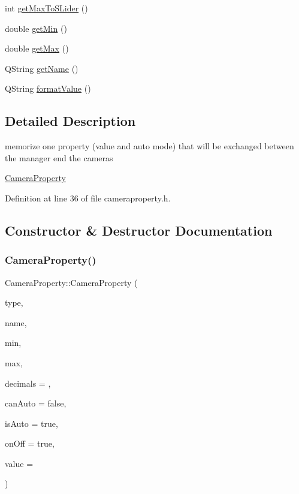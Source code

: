 \begin{DoxyCompactItemize}
int \mbox{\hyperlink{class_camera_manager_1_1_camera_property_a756d1e67c3e8f994e836c6b2b3334f13}{get\+Max\+To\+S\+Lider}} ()
\item 
double \mbox{\hyperlink{class_camera_manager_1_1_camera_property_a41de5747a0e0fa788b2e3260dc44d286}{get\+Min}} ()
\item 
double \mbox{\hyperlink{class_camera_manager_1_1_camera_property_ac4fc8a13780145042b4a8a825490aca4}{get\+Max}} ()
\item 
Q\+String \mbox{\hyperlink{class_camera_manager_1_1_camera_property_a789075edb5350c79f7fd807f3360d7e4}{get\+Name}} ()
\item 
Q\+String \mbox{\hyperlink{class_camera_manager_1_1_camera_property_ab3f85bdadf9078d3af6c1cf42f8fb1f1}{format\+Value}} ()
\end{DoxyCompactItemize}


\subsection{Detailed Description}
memorize one property (value and auto mode) that will be exchanged between the manager end the cameras 

\mbox{\hyperlink{class_camera_manager_1_1_camera_property}{Camera\+Property}} 

Definition at line 36 of file cameraproperty.\+h.



\subsection{Constructor \& Destructor Documentation}
\mbox{\label{class_camera_manager_1_1_camera_property_a7f096010f1d8c0cb5a0b7e3c592196a6}} 
\subsubsection{\texorpdfstring{CameraProperty()}{CameraProperty()}}
{\footnotesize\ttfamily Camera\+Property\+::\+Camera\+Property (\begin{DoxyParamCaption}\item[{\mbox{\hyperlink{namespace_camera_manager_a91c5befa73ac521c804690839ad888ab}{Camera\+Manager\+::\+Property\+Type}}}]{type,  }\item[{Q\+String}]{name,  }\item[{double}]{min,  }\item[{double}]{max,  }\item[{int}]{decimals = {},  }\item[{bool}]{can\+Auto = {\ttfamily false},  }\item[{bool}]{is\+Auto = {\ttfamily true},  }\item[{bool}]{on\+Off = {\ttfamily true},  }\item[{double}]{value = {} }\end{DoxyParamCaption})}



